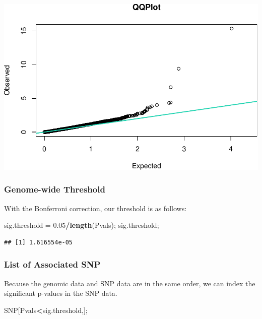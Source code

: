 \documentclass[
]{article}
\newenvironment{Shaded}{\begin{snugshade}}{\end{snugshade}}
\newcommand{\FloatTok}[1]{\textcolor[rgb]{0.00,0.00,0.81}{#1}}
\newcommand{\KeywordTok}[1]{\textcolor[rgb]{0.13,0.29,0.53}{\textbf{#1}}}
\newcommand{\NormalTok}[1]{#1}
\newcommand{\OperatorTok}[1]{\textcolor[rgb]{0.81,0.36,0.00}{\textbf{#1}}}
\newcommand{\StringTok}[1]{\textcolor[rgb]{0.31,0.60,0.02}{#1}}
\begin{document}
\includegraphics{Homework4_JKGWAS_files/figure-latex/unnamed-chunk-4-1.pdf}

\hypertarget{genome-wide-threshold}{%
\subsubsection{Genome-wide Threshold}\label{genome-wide-threshold}}

With the Bonferroni correction, our threshold is as follows:

\begin{Shaded}
\begin{Highlighting}[]
\NormalTok{sig.threshold =}\StringTok{ }\FloatTok{0.05}\OperatorTok{/}\KeywordTok{length}\NormalTok{(Pvals);}
\NormalTok{sig.threshold;}
\end{Highlighting}
\end{Shaded}

\begin{verbatim}
## [1] 1.616554e-05
\end{verbatim}

\hypertarget{list-of-associated-snp}{%
\subsubsection{List of Associated SNP}\label{list-of-associated-snp}}

Because the genomic data and SNP data are in the same order, we can
index the significant p-values in the SNP data.

\begin{Shaded}
\begin{Highlighting}[]
\NormalTok{SNP[Pvals}\OperatorTok{\textless{}}\NormalTok{sig.threshold,];}
\end{Highlighting}
\end{Shaded}
\end{document}
